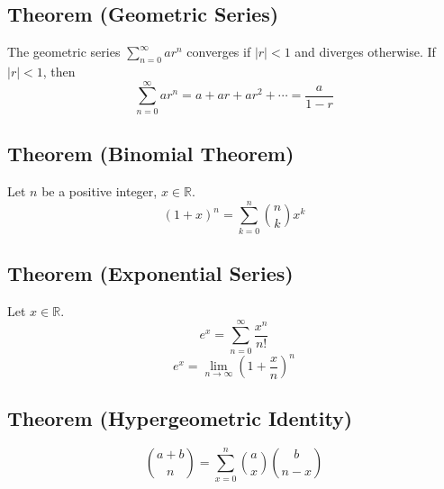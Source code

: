 \begin{thmbox}
    \subsection{Theorem (Geometric Series)}
    The geometric series $ \sum\limits_{n=0}^{\infty} ar^n $ converges
    if $ |r|<1 $ and diverges otherwise. If $ |r|<1 $, then
    \[ \sum\limits_{n=0}^{\infty} ar^n=a+ar+ar^2+\cdots =\frac{a}{1-r}  \]
\end{thmbox}

\begin{thmbox}
    \subsection{Theorem (Binomial Theorem)}
    Let $ n $ be a positive integer, $ x\in\mathbb{R} $.
    \[ (1+x)^n=\sum\limits_{k=0}^{n} \binom{n}{k}x^k \]
\end{thmbox}

\begin{thmbox}
    \subsection{Theorem (Exponential Series)}
    Let $ x\in\mathbb{R} $.
    \[ e^x=\sum\limits_{n=0}^{\infty}\frac{x^n}{n!}  \]
    \[ e^x=\lim\limits_{{n} \to {\infty}} \left( 1+\frac{x}{n}  \right)^n \]
\end{thmbox}

\begin{thmbox}
    \subsection{Theorem (Hypergeometric Identity)}
    \[ \binom{a+b}{n}=\sum\limits_{x=0}^{n} \binom{a}{x}\binom{b}{n-x} \]
\end{thmbox}

